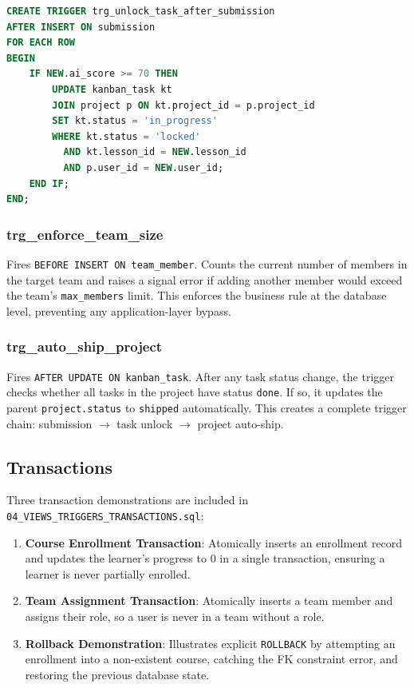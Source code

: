 \documentclass[12pt,a4paper]{article}
\begin{document}
\begin{lstlisting}[language=SQL, caption={trg\_unlock\_task\_after\_submission (abbreviated)}]
CREATE TRIGGER trg_unlock_task_after_submission
AFTER INSERT ON submission
FOR EACH ROW
BEGIN
    IF NEW.ai_score >= 70 THEN
        UPDATE kanban_task kt
        JOIN project p ON kt.project_id = p.project_id
        SET kt.status = 'in_progress'
        WHERE kt.status = 'locked'
          AND kt.lesson_id = NEW.lesson_id
          AND p.user_id = NEW.user_id;
    END IF;
END;
\end{lstlisting}

\subsubsection{trg\_enforce\_team\_size}

Fires \texttt{BEFORE INSERT ON team\_member}. Counts the current number of members in the
target team and raises a signal error if adding another member would exceed the team's
\texttt{max\_members} limit. This enforces the business rule at the database level, preventing
any application-layer bypass.

\subsubsection{trg\_auto\_ship\_project}

Fires \texttt{AFTER UPDATE ON kanban\_task}. After any task status change, the trigger checks
whether all tasks in the project have status \texttt{done}. If so, it updates the parent
\texttt{project.status} to \texttt{shipped} automatically. This creates a complete trigger
chain: submission $\rightarrow$ task unlock $\rightarrow$ project auto-ship.

\subsection{Transactions}

Three transaction demonstrations are included in \texttt{04\_VIEWS\_TRIGGERS\_TRANSACTIONS.sql}:

\begin{enumerate}[label=\arabic*., itemsep=4pt]
    \item \textbf{Course Enrollment Transaction}: Atomically inserts an enrollment record and
          updates the learner's progress to 0 in a single transaction, ensuring a learner is
          never partially enrolled.
    \item \textbf{Team Assignment Transaction}: Atomically inserts a team member and assigns
          their role, so a user is never in a team without a role.
    \item \textbf{Rollback Demonstration}: Illustrates explicit \texttt{ROLLBACK} by attempting
          an enrollment into a non-existent course, catching the FK constraint error, and
          restoring the previous database state.
\end{enumerate}
\end{document}
